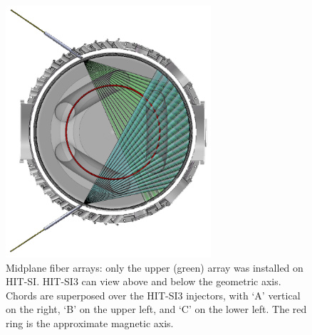 \begin{center}
\begin{figure}
\includegraphics[width=3.0in]{Mohawk_IDS_dual.png}
\caption{Midplane fiber arrays: only the upper (green) array was installed on HIT-SI. HIT-SI3 can view above and below the geometric axis. Chords are superposed over the HIT-SI3 injectors, with `A' vertical on the right, `B' on the upper left, and `C' on the lower left. The red ring is the approximate magnetic axis.}\label{Fibers Midplane}
\end{figure}
\end{center}
